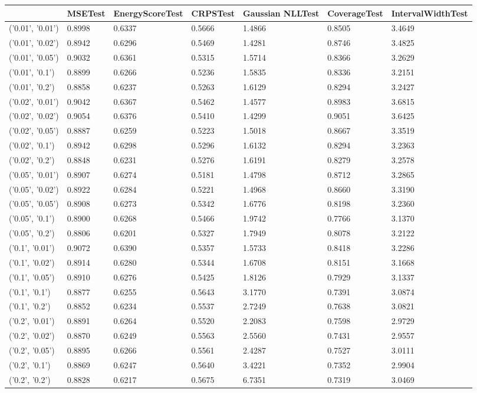 \begin{tabular}{lllllll}
\toprule
 & MSETest & EnergyScoreTest & CRPSTest & Gaussian NLLTest & CoverageTest & IntervalWidthTest \\
\midrule
('0.01', '0.01') & 0.8998 & 0.6337 & 0.5666 & 1.4866 & 0.8505 & 3.4649 \\
('0.01', '0.02') & 0.8942 & 0.6296 & 0.5469 & 1.4281 & 0.8746 & 3.4825 \\
('0.01', '0.05') & 0.9032 & 0.6361 & 0.5315 & 1.5714 & 0.8366 & 3.2629 \\
('0.01', '0.1') & 0.8899 & 0.6266 & 0.5236 & 1.5835 & 0.8336 & 3.2151 \\
('0.01', '0.2') & 0.8858 & 0.6237 & 0.5263 & 1.6129 & 0.8294 & 3.2427 \\
('0.02', '0.01') & 0.9042 & 0.6367 & 0.5462 & 1.4577 & 0.8983 & 3.6815 \\
('0.02', '0.02') & 0.9054 & 0.6376 & 0.5410 & 1.4299 & 0.9051 & 3.6425 \\
('0.02', '0.05') & 0.8887 & 0.6259 & 0.5223 & 1.5018 & 0.8667 & 3.3519 \\
('0.02', '0.1') & 0.8942 & 0.6298 & 0.5296 & 1.6132 & 0.8294 & 3.2363 \\
('0.02', '0.2') & 0.8848 & 0.6231 & 0.5276 & 1.6191 & 0.8279 & 3.2578 \\
('0.05', '0.01') & 0.8907 & 0.6274 & 0.5181 & 1.4798 & 0.8712 & 3.2865 \\
('0.05', '0.02') & 0.8922 & 0.6284 & 0.5221 & 1.4968 & 0.8660 & 3.3190 \\
('0.05', '0.05') & 0.8908 & 0.6273 & 0.5342 & 1.6776 & 0.8198 & 3.2360 \\
('0.05', '0.1') & 0.8900 & 0.6268 & 0.5466 & 1.9742 & 0.7766 & 3.1370 \\
('0.05', '0.2') & 0.8806 & 0.6201 & 0.5327 & 1.7949 & 0.8078 & 3.2122 \\
('0.1', '0.01') & 0.9072 & 0.6390 & 0.5357 & 1.5733 & 0.8418 & 3.2286 \\
('0.1', '0.02') & 0.8914 & 0.6280 & 0.5344 & 1.6708 & 0.8151 & 3.1668 \\
('0.1', '0.05') & 0.8910 & 0.6276 & 0.5425 & 1.8126 & 0.7929 & 3.1337 \\
('0.1', '0.1') & 0.8877 & 0.6255 & 0.5643 & 3.1770 & 0.7391 & 3.0874 \\
('0.1', '0.2') & 0.8852 & 0.6234 & 0.5537 & 2.7249 & 0.7638 & 3.0821 \\
('0.2', '0.01') & 0.8891 & 0.6264 & 0.5520 & 2.2083 & 0.7598 & 2.9729 \\
('0.2', '0.02') & 0.8870 & 0.6249 & 0.5563 & 2.5560 & 0.7431 & 2.9557 \\
('0.2', '0.05') & 0.8895 & 0.6266 & 0.5561 & 2.4287 & 0.7527 & 3.0111 \\
('0.2', '0.1') & 0.8869 & 0.6247 & 0.5640 & 3.4221 & 0.7352 & 2.9904 \\
('0.2', '0.2') & 0.8828 & 0.6217 & 0.5675 & 6.7351 & 0.7319 & 3.0469 \\
\bottomrule
\end{tabular}
